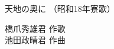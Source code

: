 \documentclass[10pt,b5j]{tarticle} %
\begin{document}
\begin{minipage}[c]{0.7\hsize} %
    \begin{center}
        {\LARGE
            天地の奥に %
        }
        {\small 
            （昭和18年寮歌） %
        }
    \end{center}
\end{minipage}
\begin{minipage}[c]{0.3\hsize} %
    \begin{flushright} %
        橋爪秀雄君 作歌\\池田政晴君 作曲 %
    \end{flushright}
\end{minipage}
\end{document}
